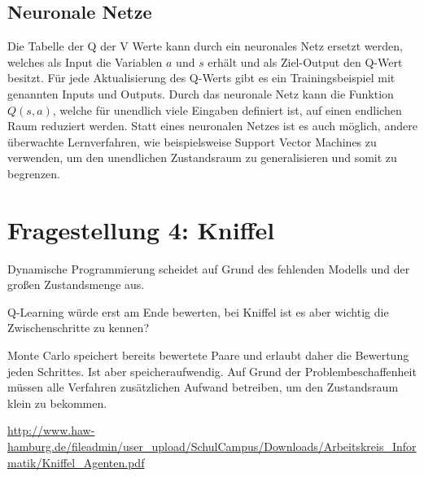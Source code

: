 \documentclass[10pt]{scrartcl}
\begin{document}
\subsection{Neuronale Netze}
Die Tabelle der Q der V Werte kann durch ein neuronales Netz ersetzt werden, welches als Input die Variablen $a$ und $s$ erhält und als Ziel-Output den Q-Wert besitzt. Für jede Aktualisierung des Q-Werts gibt es ein Trainingsbeispiel mit genannten Inputs und Outputs. Durch das neuronale Netz kann die Funktion $Q(s,a)$, welche für unendlich viele Eingaben definiert ist, auf einen endlichen Raum reduziert werden.
Statt eines neuronalen Netzes ist es auch möglich, andere überwachte Lernverfahren, wie beispielsweise Support Vector Machines zu verwenden, um den unendlichen Zustandsraum zu generalisieren und somit zu begrenzen.



\section{Fragestellung 4: Kniffel}
Dynamische Programmierung scheidet auf Grund des fehlenden Modells und der großen Zustandsmenge aus.

Q-Learning würde erst am Ende bewerten, bei Kniffel ist es aber wichtig die Zwischenschritte zu kennen?

Monte Carlo speichert bereits bewertete Paare und erlaubt daher die Bewertung jeden Schrittes. Ist aber speicheraufwendig.
Auf Grund der Problembeschaffenheit müssen alle Verfahren zusätzlichen Aufwand betreiben, um den Zustandsraum klein zu bekommen.

\url{http://www.haw-hamburg.de/fileadmin/user_upload/SchulCampus/Downloads/Arbeitskreis_Informatik/Kniffel_Agenten.pdf}
\listoftodos
\end{document}
